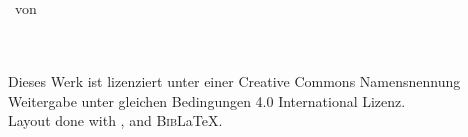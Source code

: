 \begin{titlepage}
\centering
{\huge \titel}\bigskip\\  
{\Large \untertitel}\bigskip\\
{\large \thesisname\ von\ \authorname}\bigskip\\
\begin{abstract}
\warn{\blindtext}
\end{abstract}
\par\vfill
\authorname \bigskip\\
\ccbysa\\
Dieses Werk ist lizenziert unter einer Creative Commons Namensnennung\\
Weitergabe unter gleichen Bedingungen 4.0 International Lizenz.\bigskip\\
Layout done with {\rmfamily \LaTeXe}, {\sffamily \KOMAScript} and {\rmfamily B\textsc{ib}\LaTeX}.
\end{titlepage}
\clearpage
